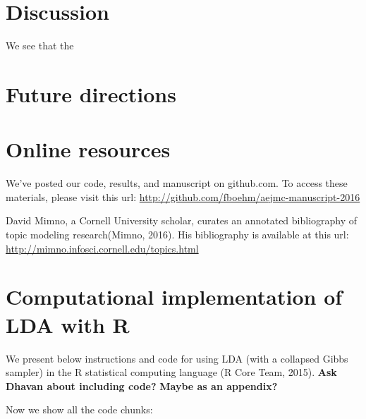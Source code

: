 \documentclass[12pt,]{article}
\begin{document}
\section{Discussion}\label{discussion}

We see that the

\section{Future directions}\label{future-directions}

\section{Online resources}\label{online-resources}

We've posted our code, results, and manuscript on github.com. To access
these materials, please visit this url:
\url{http://github.com/fboehm/aejmc-manuscript-2016}

David Mimno, a Cornell University scholar, curates an annotated
bibliography of topic modeling research(Mimno, 2016). His bibliography
is available at this url:
\url{http://mimno.infosci.cornell.edu/topics.html}

\section{Computational implementation of LDA with
R}\label{computational-implementation-of-lda-with-r}

We present below instructions and code for using LDA (with a collapsed
Gibbs sampler) in the R statistical computing language (R Core Team,
2015). \textbf{Ask Dhavan about including code?} \textbf{Maybe as an
appendix?}

Now we show all the code chunks:
\end{document}

